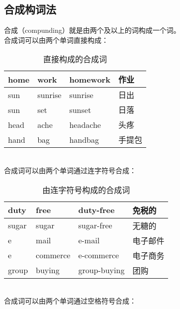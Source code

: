 \documentclass[UTF8]{ctexart}
\begin{document}
\subsection{合成构词法}
    合成（{\ttfamily compunding}）就是由两个及以上的词构成一个词。\\[3mm]
    合成词可以由两个单词直接构成：\vspace{5pt}
    \begin{table}[h!]
        \begin{center}
            \ttfamily
            \begin{tabular}{p{60pt}|p{60pt}|p{80pt}|p{60pt}}
                \hline
                home&work&homework&作业\\ \hline
                sun&sunrise&sunrise&日出\\ \hline
                sun&set&sunset&日落\\ \hline
                head&ache&headache&头疼\\ \hline
                hand&bag&handbag&手提包\\ \hline
            \end{tabular}
            \rmfamily
            \caption{直接构成的合成词}
        \end{center}
    \end{table}\\
    合成词可以由两个单词通过连字符号合成：\vspace{5pt}
    \begin{table}[h!]
        \begin{center}
            \ttfamily
            \begin{tabular}{p{60pt}|p{60pt}|p{80pt}|p{60pt}}
                \hline
                duty&free&duty-free&免税的\\ \hline
                sugar&sugar&sugar-free&无糖的\\ \hline
                e&mail&e-mail&电子邮件\\ \hline
                e&commerce&e-commerce&电子商务\\ \hline
                group&buying&group-buying&团购\\ \hline
            \end{tabular}
            \rmfamily
            \caption{由连字符号构成的合成词}
        \end{center}
    \end{table}\\
    合成词可以由两个单词通过空格符号合成：\vspace{5pt}
\end{document}

